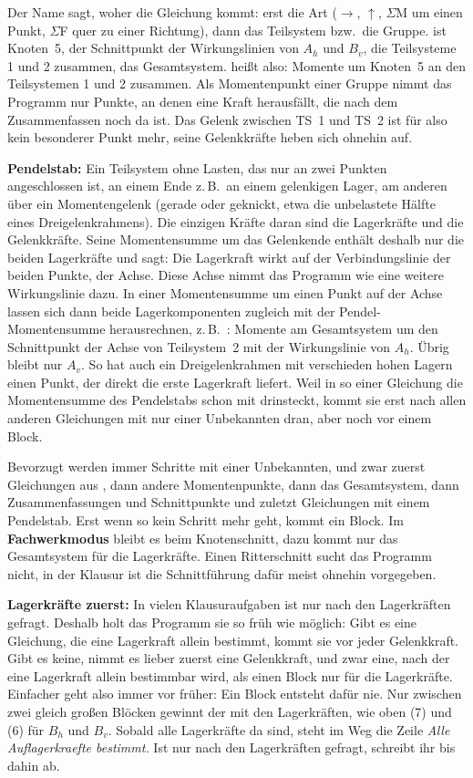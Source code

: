 Der Name sagt, woher die Gleichung kommt: erst die Art ($\rightarrow$, $\uparrow$, $\Sigma$M um
einen Punkt, $\Sigma$F quer zu einer Richtung), dann das Teilsystem bzw.\ die Gruppe. 
ist Knoten~5,  der Schnittpunkt der Wirkungslinien von $A_h$ und $B_v$,
 die Teilsysteme 1 und 2 zusammen,  das Gesamtsystem.  heißt also:
Momente um Knoten~5 an den Teilsystemen 1 und 2 zusammen. Als Momentenpunkt einer Gruppe nimmt
das Programm nur Punkte, an denen eine Kraft herausfällt, die nach dem Zusammenfassen noch da ist.
Das Gelenk zwischen TS~1 und TS~2 ist für  also kein besonderer Punkt mehr, seine
Gelenkkräfte heben sich ohnehin auf.

\textbf{Pendelstab:} Ein Teilsystem ohne Lasten, das nur an zwei Punkten angeschlossen ist,
an einem Ende z.\,B.\ an einem gelenkigen Lager, am anderen über ein Momentengelenk (gerade oder
geknickt, etwa die unbelastete Hälfte eines Dreigelenkrahmens). Die einzigen Kräfte daran sind die
Lagerkräfte und die Gelenkkräfte. Seine Momentensumme um das Gelenkende enthält deshalb nur die
beiden Lagerkräfte und sagt: Die Lagerkraft wirkt auf der Verbindungslinie der beiden Punkte, der
Achse. Diese Achse nimmt das Programm wie eine weitere Wirkungslinie dazu. In einer Momentensumme
um einen Punkt auf der Achse lassen sich dann beide Lagerkomponenten zugleich mit der
Pendel-Momentensumme herausrechnen, z.\,B.\ :
Momente am Gesamtsystem um den Schnittpunkt der Achse von Teilsystem~2 mit der Wirkungslinie von
$A_h$. Übrig bleibt nur $A_v$. So hat auch ein Dreigelenkrahmen mit verschieden hohen Lagern einen
Punkt, der direkt die erste Lagerkraft liefert. Weil in so einer Gleichung die Momentensumme des
Pendelstabs schon mit drinsteckt, kommt sie erst nach allen anderen Gleichungen mit nur einer
Unbekannten dran, aber noch vor einem Block.

Bevorzugt werden immer Schritte mit einer Unbekannten, und zwar zuerst Gleichungen aus ,
dann andere Momentenpunkte, dann das Gesamtsystem, dann Zusammenfassungen und Schnittpunkte und
zuletzt Gleichungen mit einem Pendelstab. Erst wenn so kein Schritt mehr geht, kommt ein Block. Im
\textbf{Fachwerkmodus} bleibt es beim Knotenschnitt, dazu kommt nur das Gesamtsystem für die
Lagerkräfte. Einen Ritterschnitt sucht das Programm nicht, in der Klausur ist die Schnittführung
dafür meist ohnehin vorgegeben.

\textbf{Lagerkräfte zuerst:} In vielen Klausuraufgaben ist nur nach den Lagerkräften gefragt.
Deshalb holt das Programm sie so früh wie möglich: Gibt es eine Gleichung, die eine Lagerkraft
allein bestimmt, kommt sie vor jeder Gelenkkraft. Gibt es keine, nimmt es lieber zuerst eine
Gelenkkraft, und zwar eine, nach der eine Lagerkraft allein bestimmbar wird, als einen Block nur für
die Lagerkräfte. Einfacher geht also immer vor früher: Ein Block entsteht dafür nie. Nur zwischen
zwei gleich großen Blöcken gewinnt der mit den Lagerkräften, wie oben (7) und (6) für $B_h$ und
$B_v$. Sobald alle Lagerkräfte da sind, steht im Weg die Zeile \emph{Alle Auflagerkraefte
bestimmt.} Ist nur nach den Lagerkräften gefragt, schreibt ihr bis dahin ab.

